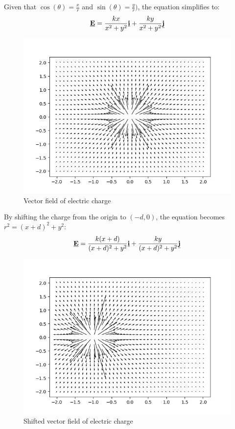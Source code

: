 \documentclass[10pt,a4paper]{article}
\begin{document}
Given that $\cos(\theta)=\frac{x}{r}$ and $\sin(\theta)=\frac{y}{r})$, the equation simplifies to:
$$
    \textbf{\underline{E}} = \frac{kx}{x^2 + y^2}\textbf{\underline{i}} + \frac{ky}{x^2+y^2}\textbf{\underline{j}}
$$
\begin{figure} [h!]
    \centering
    \includegraphics[scale=0.3]{Charge_field.JPG}
    \caption{Vector field of electric charge}
\end{figure}

By shifting the charge from the origin to $(-d,0)$, the equation becomes $r^2=(x+d)^2 + y^2$:
$$
    \textbf{\underline{E}} = \frac{k(x+d)}{(x+d)^2+y^2} \textbf{\underline{i}} + \frac{ky}{(x+d)^2 + y^2} \textbf{\underline{j}}
$$
\begin{figure} [h!]
    \centering
    \includegraphics[scale=0.3]{Charge_field2.JPEG}
    \caption{Shifted vector field of electric charge}
\end{figure}
\end{document}
